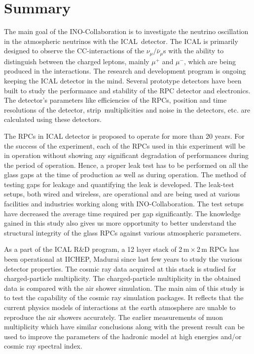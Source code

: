 \chapter{Summary}

The main goal of the INO-Collaboration is to investigate the neutrino
oscillation in the atmospheric neutrinos with the ICAL~detector.
The ICAL is primarily designed to observe the CC-interactions of
the $\nu_{\mu}/\bar{\nu}_{\mu}$s with the ability to distinguish between
the charged leptons, mainly $\mu^{+}$ and $\mu^{-}$,
which are being produced in the interactions. The research and
development program is ongoing keeping the ICAL detector in the mind.
Several prototype detectors have been built to study the performance
and stability of the RPC detector and electronics. The detector's
parameters like efficiencies of the RPCs, position and time
resolutions of the detector, strip~multiplicities and noise
in the detectors, etc. are calculated using these detectors.

The RPCs in ICAL detector is proposed to operate for more than 20
years. For the success of the experiment, each of the RPCs used in
this experiment will be in operation without showing any significant
degradation of performances during the period of operation. Hence, a
proper leak test has to be performed on all the glass gaps at the time
of production as well as during operation.
The method of testing gaps for leakage and quantifying the leak is
developed. The leak-test setups, both wired and wireless, are
operational and are being used at various facilities and industries
working along with INO-Collaboration. The test setups have decreased
the average time required per gap significantly. The knowledge gained
in this study also gives us more opportunity to better understand the
structural integrity of the glass RPCs against various atmospheric
parameters.

As a part of the ICAL R\&D program, a 12 layer stack of
2\,m\,$\times$\,2\,m RPCs has been operational at IICHEP, Madurai
since last few years to study the various detector properties. The
cosmic ray data acquired at this stack is studied for charged-particle
multiplicity. The charged-particle multiplicity in the obtained data
is compared with the air shower simulation. The main aim of this study
is to test the capability of the cosmic ray simulation packages. It
reflects that the current physics models of interactions at the earth
atmosphere are unable to reproduce the air showers accurately. The
earlier measurements of muon multiplicity which have similar
conclusions along with the present result can be used to improve the
parameters of the hadronic model at high energies and/or cosmic ray
spectral index.


